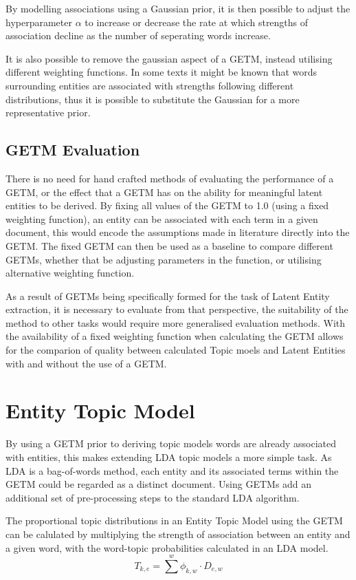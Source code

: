 \documentclass[10pt]{report}
\begin{document}
By modelling associations using a Gaussian prior, it is then possible to adjust the hyperparameter \(\alpha\) to increase or decrease the rate at which strengths of association decline as the number of seperating words increase.

It is also possible to remove the gaussian aspect of a GETM, instead utilising different weighting functions. In some texts it might be known that words surrounding entities are associated with strengths following different distributions, thus it is possible to substitute the Gaussian for a more representative prior. 

\subsection{GETM Evaluation}
There is no need for hand crafted methods of evaluating the performance of a GETM, or the effect that a GETM has on the ability for meaningful latent entities to be derived. By fixing all values of the GETM to 1.0 (using a fixed weighting function), an entity can be associated with each term in a given document, this would encode the assumptions made in literature directly into the GETM. The fixed GETM can then be used as a baseline to compare different GETMs, whether that be adjusting parameters in the function, or utilising alternative weighting function.

As a result of GETMs being specifically formed for the task of Latent Entity extraction, it is necessary to evaluate from that perspective, the suitability of the method to other tasks would require more generalised evaluation methods. With the availability of a fixed weighting function when calculating the GETM allows for the comparion of quality between calculated Topic moels and Latent Entities with and without the use of a GETM.

\section{Entity Topic Model}
By using a GETM prior to deriving topic models words are already associated with entities, this makes extending LDA topic models a more simple task. As LDA is a bag-of-words method, each entity and its associated terms within the GETM could be regarded as a distinct document. Using GETMs add an additional set of pre-processing steps to the standard LDA algorithm.

The proportional topic distributions in an Entity Topic Model using the GETM can be calulated by multiplying the strength of association between an entity and a given word, with the word-topic probabilities calculated in an LDA model.
\[
  T_{k,e} = \sum^w \phi_{k,w} \cdot D_{e,w}
\]
\end{document}
